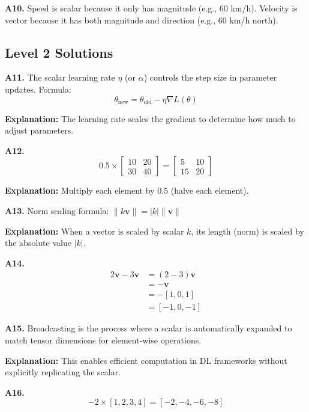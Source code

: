 \documentclass[11pt,a4paper]{article}
\begin{document}
\textbf{A10.} Speed is scalar because it only has magnitude (e.g., 60 km/h). Velocity is vector because it has both magnitude and direction (e.g., 60 km/h north).

\subsection{Level 2 Solutions}

\textbf{A11.} The scalar learning rate $\eta$ (or $\alpha$) controls the step size in parameter updates. Formula:
\begin{equation*}
    \theta_{\text{new}} = \theta_{\text{old}} - \eta \nabla L(\theta)
\end{equation*}

\textbf{Explanation:} The learning rate scales the gradient to determine how much to adjust parameters.

\textbf{A12.}
\begin{equation*}
    0.5 \times \begin{bmatrix} 10 & 20 \\ 30 & 40 \end{bmatrix} = \begin{bmatrix} 5 & 10 \\ 15 & 20 \end{bmatrix}
\end{equation*}

\textbf{Explanation:} Multiply each element by 0.5 (halve each element).

\textbf{A13.} Norm scaling formula: $\|k\mathbf{v}\| = |k| \|\mathbf{v}\|$

\textbf{Explanation:} When a vector is scaled by scalar $k$, its length (norm) is scaled by the absolute value $|k|$.

\textbf{A14.}
\begin{align*}
    2\mathbf{v} - 3\mathbf{v} &= (2-3)\mathbf{v} \\
    &= -\mathbf{v} \\
    &= -[1, 0, 1] \\
    &= [-1, 0, -1]
\end{align*}

\textbf{A15.} Broadcasting is the process where a scalar is automatically expanded to match tensor dimensions for element-wise operations.

\textbf{Explanation:} This enables efficient computation in DL frameworks without explicitly replicating the scalar.

\textbf{A16.}
\begin{equation*}
    -2 \times [1, 2, 3, 4] = [-2, -4, -6, -8]
\end{equation*}
\end{document}
